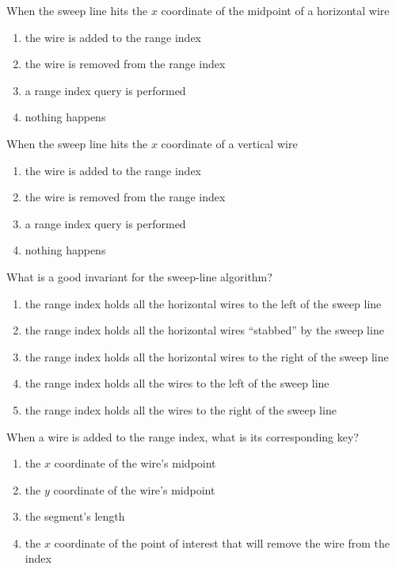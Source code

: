 \documentclass[12pt,twoside]{article}
\begin{document}
\begin{problems}
\begin{problemparts}
\problempart {} When the sweep line hits the $x$ coordinate of the
midpoint of a horizontal wire
\begin{enumerate}
  \item the wire is added to the range index
  \item the wire is removed from the range index
  \item a range index query is performed
  \item nothing happens
\end{enumerate}

\problempart {} When the sweep line hits the $x$ coordinate of a 
vertical wire
\begin{enumerate}
  \item the wire is added to the range index
  \item the wire is removed from the range index
  \item a range index query is performed
  \item nothing happens
\end{enumerate}

\problempart {} What is a good invariant for the sweep-line algorithm?

\begin{enumerate}
  \item the range index holds all the horizontal wires to the left of the
  sweep line
  \item the range index holds all the horizontal wires ``stabbed'' by the
  sweep line
  \item the range index holds all the horizontal wires to the right of the
  sweep line
  \item the range index holds all the wires to the left of the sweep line
  \item the range index holds all the wires to the right of the sweep line
\end{enumerate}

\problempart {} When a wire is added to the range index, what is its
corresponding key?

\begin{enumerate}
  \item the $x$ coordinate of the wire's midpoint
  \item the $y$ coordinate of the wire's midpoint
  \item the segment's length
  \item the $x$ coordinate of the point of interest that will remove the wire
  from the index
\end{enumerate}
\end{problemparts}


\end{problems}
\end{document}
